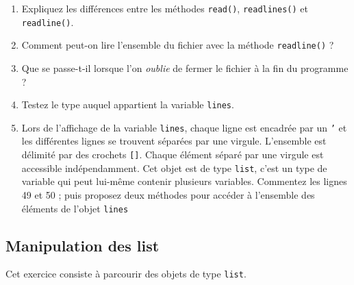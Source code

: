 \begin{enumerate}

\item Expliquez  les différences  entre les  méthodes \texttt{read()},
  \texttt{readlines()} et \texttt{readline()}.

\item  Comment peut-on lire  l'ensemble  du fichier  avec la  méthode
  \texttt{readline()} ?

\item  Que se  passe-t-il lorsque  l'on \textit{oublie}  de fermer  le
  fichier à la fin du programme ?

\item Testez le type auquel appartient la variable \texttt{lines}.

\item Lors de l'affichage de  la variable \texttt{lines}, chaque ligne
  est encadrée par un \texttt{'}  et les différentes lignes se trouvent
  séparées par une  virgule. L'ensemble est délimité  par des crochets
  \texttt{[]}.  Chaque  élément séparé par une  virgule est accessible
  indépendamment.  Cet objet est de  type \texttt{list}, c'est un type
  de  variable   qui  peut  lui-même  contenir   plusieurs  variables.
  Commentez  les lignes  49 et  50 ; puis proposez  deux méthodes  pour
  accéder à l'ensemble des éléments de l'objet \texttt{lines}

\end{enumerate}

\subsection{Manipulation des list}


Cet exercice consiste à parcourir des objets de type \texttt{list}.

